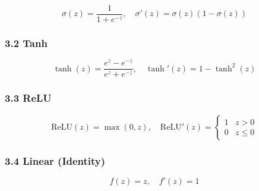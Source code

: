 \documentclass[11pt]{article}
\begin{document}
\[\sigma(z) = \frac{1}{1 + e^{-z}}, \quad \sigma'(z) = \sigma(z)(1 - \sigma(z))\]

\subsubsection{3.2 Tanh}\label{tanh}

\[\tanh(z) = \frac{e^z - e^{-z}}{e^z + e^{-z}}, \quad \tanh'(z) = 1 - \tanh^2(z)\]

\subsubsection{3.3 ReLU}\label{relu}

\[\text{ReLU}(z) = \max(0, z), \quad \text{ReLU}'(z) = \begin{cases} 1 & z > 0 \\ 0 & z \leq 0 \end{cases}\]

\subsubsection{3.4 Linear (Identity)}\label{linear-identity}

\[f(z) = z, \quad f'(z) = 1\]
\end{document}
